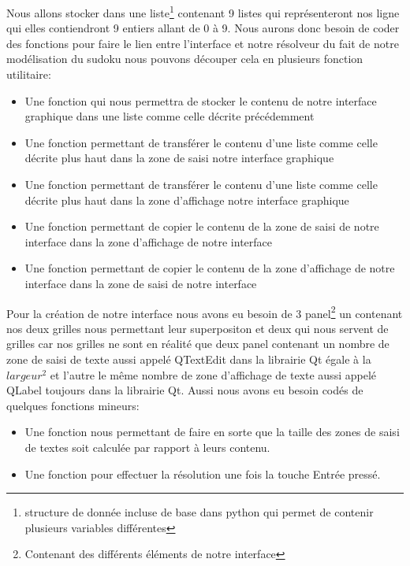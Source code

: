 Nous allons stocker dans une liste\footnote{\label{liste_Python}structure de donnée incluse de base dans python qui permet de contenir plusieurs variables différentes} contenant 9 listes qui représenteront nos ligne qui elles contiendront 9 entiers allant de 0 à 9. Nous aurons donc besoin de coder des fonctions pour faire le lien entre l'interface et notre résolveur du fait de notre modélisation du sudoku nous pouvons découper cela en plusieurs fonction utilitaire:\newline
\begin{itemize}
\item Une fonction qui nous permettra de stocker le contenu de notre interface graphique dans une liste comme celle décrite précédemment
\item Une fonction permettant de transférer le contenu d'une liste comme celle décrite plus haut dans la zone de saisi notre interface graphique
\item Une fonction permettant de transférer le contenu d'une liste comme celle décrite plus haut dans la zone d'affichage notre interface graphique
\item Une fonction permettant de copier le contenu de la zone de saisi de notre interface dans la zone d'affichage de notre interface
\item Une fonction permettant de copier le contenu de la zone d'affichage de notre interface dans la zone de saisi de notre interface
\end{itemize}

Pour la création de notre interface nous avons eu besoin de 3 panel\footnote{Contenant des différents éléments de notre interface} un contenant nos deux grilles nous permettant leur superpositon et deux qui nous servent de grilles car nos grilles ne sont en réalité que deux panel contenant un nombre de zone de saisi de texte aussi appelé QTextEdit dans la librairie Qt égale à la $largeur^{2}$ et l'autre le même nombre de zone d'affichage de texte aussi appelé QLabel toujours dans la librairie Qt. Aussi nous avons eu besoin codés de quelques fonctions mineurs:\newline

\begin{itemize}
\item Une fonction nous permettant de faire en sorte que la taille des zones de saisi de textes soit calculée par rapport à leurs contenu.
\item Une fonction pour effectuer la résolution une fois la touche Entrée pressé.
\end{itemize}

